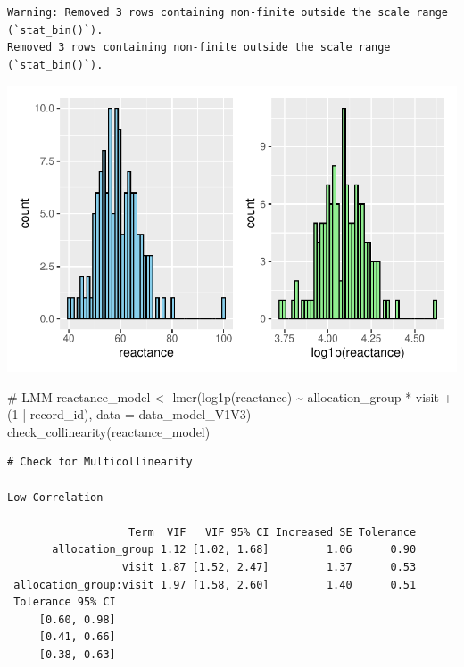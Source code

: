 \documentclass[
  letterpaper,
  DIV=11,
  numbers=noendperiod]{scrartcl}
\newenvironment{Shaded}{\begin{snugshade}}{\end{snugshade}}
\newcommand{\AttributeTok}[1]{\textcolor[rgb]{0.40,0.45,0.13}{#1}}
\newcommand{\CommentTok}[1]{\textcolor[rgb]{0.37,0.37,0.37}{#1}}
\newcommand{\DecValTok}[1]{\textcolor[rgb]{0.68,0.00,0.00}{#1}}
\newcommand{\FunctionTok}[1]{\textcolor[rgb]{0.28,0.35,0.67}{#1}}
\newcommand{\NormalTok}[1]{\textcolor[rgb]{0.00,0.23,0.31}{#1}}
\newcommand{\OtherTok}[1]{\textcolor[rgb]{0.00,0.23,0.31}{#1}}
\newcommand{\SpecialCharTok}[1]{\textcolor[rgb]{0.37,0.37,0.37}{#1}}
\begin{document}
\begin{verbatim}
Warning: Removed 3 rows containing non-finite outside the scale range (`stat_bin()`).
Removed 3 rows containing non-finite outside the scale range (`stat_bin()`).
\end{verbatim}

\includegraphics{Outcomes_V1V2V3_files/figure-pdf/reactance_1-1.pdf}

\begin{Shaded}
\begin{Highlighting}[]
\CommentTok{\# LMM}
\NormalTok{reactance\_model }\OtherTok{\textless{}{-}} \FunctionTok{lmer}\NormalTok{(}\FunctionTok{log1p}\NormalTok{(reactance) }\SpecialCharTok{\textasciitilde{}}\NormalTok{ allocation\_group }\SpecialCharTok{*}\NormalTok{ visit }\SpecialCharTok{+}\NormalTok{ (}\DecValTok{1} \SpecialCharTok{|}\NormalTok{ record\_id), }\AttributeTok{data =}\NormalTok{ data\_model\_V1V3)}
\FunctionTok{check\_collinearity}\NormalTok{(reactance\_model)}
\end{Highlighting}
\end{Shaded}

\begin{verbatim}
# Check for Multicollinearity

Low Correlation

                   Term  VIF   VIF 95% CI Increased SE Tolerance
       allocation_group 1.12 [1.02, 1.68]         1.06      0.90
                  visit 1.87 [1.52, 2.47]         1.37      0.53
 allocation_group:visit 1.97 [1.58, 2.60]         1.40      0.51
 Tolerance 95% CI
     [0.60, 0.98]
     [0.41, 0.66]
     [0.38, 0.63]
\end{verbatim}
\end{document}
